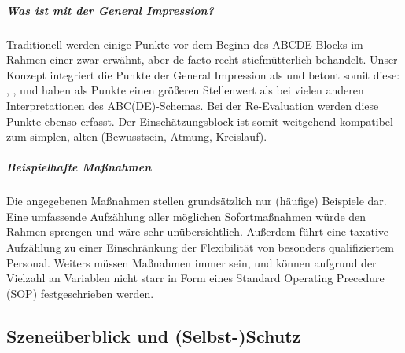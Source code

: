{\subparagraph{Was ist mit der General Impression?}
Traditionell werden einige Punkte vor dem Beginn des ABCDE-Blocks im
Rahmen einer  zwar erwähnt, aber de
facto recht stiefmütterlich behandelt. Unser Konzept integriert die Punkte der
General Impression als  und betont
somit diese:
, ,  und
 haben als Punkte  
einen größeren Stellenwert als
bei vielen anderen Interpretationen des 
ABC(DE)-Schemas. Bei der Re-Evaluation werden diese Punkte 
ebenso erfasst.
Der Einschätzungsblock ist somit weitgehend kompatibel zum
simplen, alten  (Bewusstsein, Atmung, Kreislauf).

\subparagraph{Beispielhafte Maßnahmen}
Die angegebenen Maßnahmen stellen grundsätzlich nur
(häufige) Beispiele dar. Eine umfassende Aufzählung aller
möglichen Sofortmaßnahmen würde den Rahmen sprengen und wäre
sehr unübersichtlich. Außerdem führt eine taxative
Aufzählung zu einer Einschränkung der Flexibilität von
besonders qualifiziertem Personal. Weiters müssen Maßnahmen
immer  sein, und können aufgrund der
Vielzahl an Variablen nicht starr in Form eines Standard
Operating Precedure (SOP) festgeschrieben werden.
}
{}
{}
{}
{}




\clearpage
\subsection{{} Szeneüberblick und (Selbst-)Schutz}



